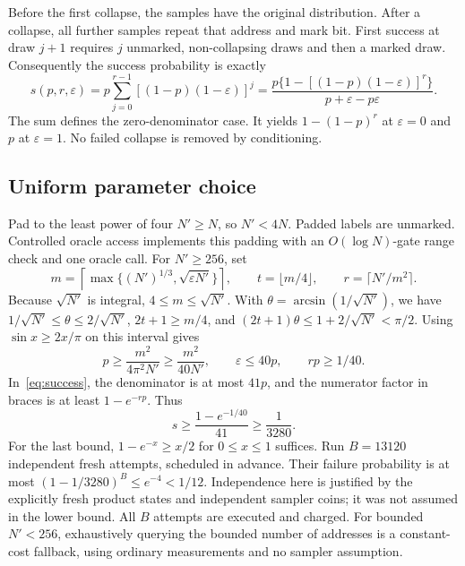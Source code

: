 \documentclass[11pt]{article}
\theoremstyle{remark}
\newcommand{\eps}{\varepsilon}
\begin{document}
Before the first collapse, the samples have the original distribution.
After a collapse, all further samples repeat that address and mark bit.
First success at draw $j+1$ requires $j$ unmarked, non-collapsing draws
and then a marked draw. Consequently the success probability is exactly
\begin{equation}\label{eq:success}
 s(p,r,\eps)=p\sum_{j=0}^{r-1}[(1-p)(1-\eps)]^j
 =\frac{p\{1-[(1-p)(1-\eps)]^r\}}{p+\eps-p\eps}.
\end{equation}
The sum defines the zero-denominator case. It yields
$1-(1-p)^r$ at $\eps=0$ and $p$ at $\eps=1$. No failed collapse is removed
by conditioning.

\subsection{Uniform parameter choice}
Pad to the least power of four $N'\ge N$, so $N'<4N$. Padded labels are
unmarked. Controlled oracle access implements this padding with an
$O(\log N)$-gate range check and one oracle call. For $N'\ge256$, set
\begin{equation}\label{eq:parameters}
 m=\left\lceil\max\{(N')^{1/3},\sqrt{\eps N'}\}\right\rceil,
 \qquad t=\lfloor m/4\rfloor,
 \qquad r=\lceil N'/m^2\rceil.
\end{equation}
Because $\sqrt{N'}$ is integral, $4\le m\le\sqrt{N'}$.
With $\theta=\arcsin(1/\sqrt{N'})$, we have
$1/\sqrt{N'}\le\theta\le2/\sqrt{N'}$,
$2t+1\ge m/4$, and
$(2t+1)\theta\le1+2/\sqrt{N'}<\pi/2$.
Using $\sin x\ge2x/\pi$ on this interval gives
\begin{equation}\label{eq:pbound}
 p\ge\frac{m^2}{4\pi^2N'}\ge\frac{m^2}{40N'},
 \qquad \eps\le40p,\qquad rp\ge1/40.
\end{equation}
In~\eqref{eq:success}, the denominator is at most $41p$, and the numerator
factor in braces is at least $1-e^{-rp}$. Thus
\begin{equation}
 s\ge\frac{1-e^{-1/40}}{41}\ge\frac1{3280}.
\end{equation}
For the last bound, $1-e^{-x}\ge x/2$ for $0\le x\le1$ suffices.
Run $B=13120$ independent fresh attempts, scheduled in advance. Their
failure probability is at most $(1-1/3280)^B\le e^{-4}<1/12$.
Independence here is justified by the explicitly fresh product states and
independent sampler coins; it was not assumed in the lower bound.
All $B$ attempts are executed and charged. For bounded $N'<256$,
exhaustively querying the bounded number of addresses is a constant-cost
fallback, using ordinary measurements and no sampler assumption.
\end{document}
